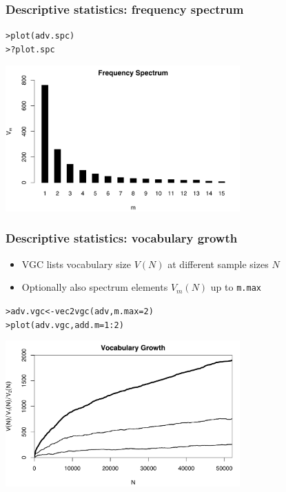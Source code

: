 \documentclass[t]{beamer} %
\begin{document}
\begin{frame}[fragile]
  \frametitle{Descriptive statistics: frequency spectrum}

\begin{alltt}
> plot(adv.spc)      
> ?plot.spc          
\end{alltt}

  \begin{center}
    \includegraphics[width=9cm]{img/brown_adverbs_spc}
  \end{center}
\end{frame}

\begin{frame}[fragile]
  \frametitle{Descriptive statistics: vocabulary growth}

  \begin{itemize}
  \item VGC lists vocabulary size $V(N)$ at different sample sizes $N$
  \item Optionally also spectrum elements $V_m(N)$ up to \texttt{m.max}
  \end{itemize}
  
\begin{alltt}
> adv.vgc <- vec2vgc(adv, m.max=2) 
> plot(adv.vgc, add.m=1:2) 
\end{alltt}

  \begin{center}
    \includegraphics[width=9cm]{img/brown_adverbs_vgc}
  \end{center}
\end{frame}
\end{document}
